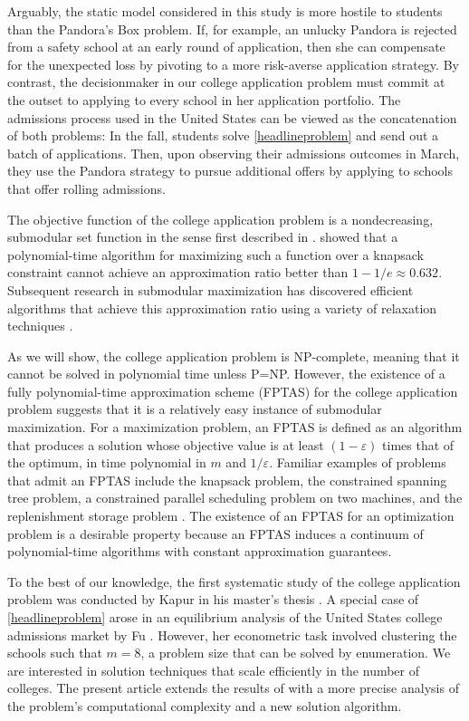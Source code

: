 Arguably, the static model considered in this study is more hostile to students than the Pandora's Box problem. If, for example, an unlucky Pandora is rejected from a safety school at an early round of application, then she can compensate for the unexpected loss by pivoting to a more risk-averse application strategy. By contrast, the decisionmaker in our college application problem must commit at the outset to applying to every school in her application portfolio. The admissions process used in the United States can be viewed as the concatenation of both problems: In the fall, students solve \eqref{headlineproblem} and send out a batch of applications. Then, upon observing their admissions outcomes in March, they use the Pandora strategy to pursue additional offers by applying to schools that offer rolling admissions.

The objective function of the college application problem is a nondecreasing, submodular set function in the sense first described in \cite{nemhauseretal1978}. \cite{nemhauserandwolsey1978} showed that a polynomial-time algorithm for maximizing such a function over a knapsack constraint cannot achieve an approximation ratio better than $1 - 1 / e \approx 0.632$. Subsequent research in submodular maximization has discovered efficient algorithms that achieve this approximation ratio using a variety of relaxation techniques \cite{chekurietal2014,badanidiyuruandvondrak2014,kuliketal2013}.

As we will show, the college application problem is NP-complete, meaning that it cannot be solved in polynomial time unless P=NP. However, the existence of a fully polynomial-time approximation scheme (FPTAS) for the college application problem suggests that it is a relatively easy instance of submodular maximization. For a maximization problem, an FPTAS is defined as an algorithm that produces a solution whose objective value is at least $(1 - \varepsilon)$ times that of the optimum, in time polynomial in $m$ and $1 / \varepsilon$. Familiar examples of problems that admit an FPTAS include the knapsack problem, the constrained spanning tree problem, a constrained parallel scheduling problem on two machines, and the replenishment storage problem \cite{vazirani2001,hongetal2004,woeginger2005,hochbaumandrao2020}. The existence of an FPTAS for an optimization problem is a desirable property because an FPTAS induces a continuum of polynomial-time algorithms with constant approximation guarantees.

To the best of our knowledge, the first systematic study of the college application problem was conducted by Kapur in his master's thesis \cite{kapur2022}. A special case of \eqref{headlineproblem} arose in an equilibrium analysis of the United States college admissions market by Fu \cite{fu2014}. However, her econometric task involved clustering the schools such that $m=8$, a problem size that can be solved by enumeration. We are interested in solution techniques that scale efficiently in the number of colleges. The present article extends the results of \cite{kapur2022} with a more precise analysis of the problem's computational complexity and a new solution algorithm.

